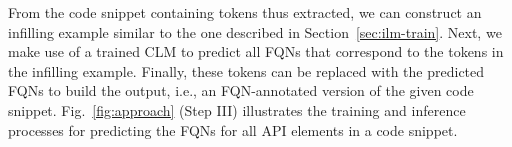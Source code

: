 From the code snippet containing \blank tokens thus extracted, we can construct an infilling example similar to the one described in Section~\ref{sec:ilm-train}. Next, we make use of a trained CLM to predict all FQNs that correspond to the \blank tokens in the infilling example.
Finally, these \blank tokens can be replaced with the predicted FQNs to build the output, i.e., an FQN-annotated version of the given code snippet. Fig.~\ref{fig:approach} (Step III) illustrates the training and inference processes for predicting the FQNs for all API elements in a code snippet.